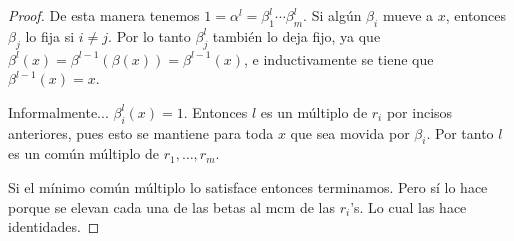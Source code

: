 \begin{enumerate}[(i)]
\begin{proof}
            De esta manera tenemos \( 1=\alpha^l = \beta_1^l \cdots \beta_m^l \). 
            Si algún \( \beta_i \) mueve a \( x \), entonces \( \beta_j \) lo fija 
            si \( i \neq j \). Por lo tanto \( \beta_{j}^l \) también lo deja fijo, 
            ya que \( \beta^l( x ) = \beta^{l-1} \left( \beta(x) \right) = \beta^{l-1} 
            \left( x \right) \), e inductivamente se tiene que \( \beta^{l-1} ( x ) = x \).

            Informalmente... \( \beta_i^l (x) = 1 \). Entonces \( l \) es un múltiplo de 
            \( r_i \) por incisos anteriores, 
            pues esto se mantiene para toda \( x \) que sea movida por \( \beta_i \).
            Por tanto \( l \) es un común múltiplo de \( r_1,\ldots,r_m \).
            
            Si el mínimo común múltiplo lo satisface entonces terminamos. Pero sí lo hace
            porque se elevan cada una de las betas al mcm de las \( r_i \)'s. Lo cual
            las hace identidades.
        \end{proof}
\end{enumerate}
 
